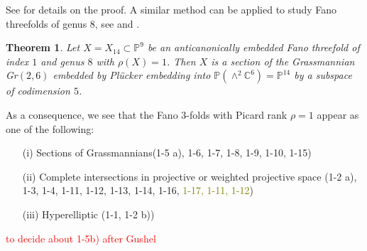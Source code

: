 \documentclass[11pt]{amsart}
\theoremstyle{plain}
\newtheorem{theorem}{Theorem}[section]
\theoremstyle{definition}
\theoremstyle{expl}
\begin{document}
See \cite{Gus6} for details on the proof.
A similar method can be applied to study Fano threefolds of genus $8$, see \cite{Gus83} and \cite{Gus92}. 
\begin{theorem}
    Let $X=X_{14} \subset \mathbb{P}^9$ be an anticanonically embedded Fano threefold of index $1$ and genus $8$ with $\rho(X)=1$. Then $X$ is a section of the Grassmannian Gr$(2,6)$ embedded by Pl\"{u}cker embedding into $\mathbb{P}(\wedge^2 \mathbb{C}^6) = \mathbb{P}^{14}$ by a subspace of codimension $5$.
\end{theorem}

As a consequence, we see that the Fano $3$-folds with Picard rank $\rho =1$ appear as one of the following: 
\begin{enumerate}
    \item[(i)] Sections of Grassmannians(1-5 a), 1-6, 1-7, 1-8, 1-9, 1-10, 1-15)
    \item[(ii)] Complete intersections in projective or weighted projective space (1-2 a), 1-3, 1-4, 1-11, 1-12, 1-13, 1-14, 1-16, \textcolor{olive}{1-17, 1-11, 1-12})
    \item[(iii)] Hyperelliptic (1-1, 1-2 b))
\end{enumerate}
\textcolor{red}{to decide about 1-5b) after Gushel}
	
	
	
	
	
	
\end{document}
